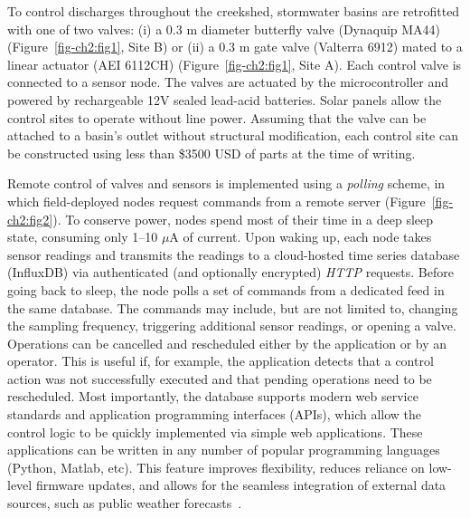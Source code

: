 To control discharges throughout the creekshed, stormwater basins are retrofitted with one of two valves: (i) a 0.3 m diameter butterfly valve (Dynaquip MA44) (Figure~\ref{fig-ch2:fig1}, Site B) or (ii) a 0.3 m gate valve (Valterra 6912) mated to a linear actuator (AEI 6112CH) (Figure~\ref{fig-ch2:fig1}, Site A). Each control valve is connected to a sensor node. The valves are actuated by the microcontroller and powered by rechargeable 12V sealed lead-acid batteries. Solar panels allow the control sites to operate without line power. Assuming that the valve can be attached to a basin's outlet without structural modification, each control site can be constructed using less than \$3500 USD of parts at the time of writing.

Remote control of valves and sensors is implemented using a \textit{polling} scheme, in which field-deployed nodes request commands from a remote server (Figure~\ref{fig-ch2:fig2}). To conserve power, nodes spend most of their time in a deep sleep state, consuming only 1--10 $\mu$A of current. Upon waking up, each node takes sensor readings and transmits the readings to a cloud-hosted time series database (InfluxDB) via authenticated (and optionally encrypted) \textit{HTTP} requests. Before going back to sleep, the node polls a set of commands from a dedicated feed in the same database. The commands may include, but are not limited to, changing the sampling frequency, triggering additional sensor readings, or opening a valve.
Operations can be cancelled and rescheduled either by the application or by an operator. This is useful if, for example, the application detects that a control action was not successfully executed and that pending operations need to be rescheduled. Most importantly, the database supports modern web service standards and application programming interfaces (APIs), which allow the control logic to be quickly implemented via simple web applications. These applications can be written in any number of popular programming languages (Python, Matlab, etc). This feature improves flexibility, reduces reliance on low-level firmware updates, and allows for the seamless integration of external data sources, such as public weather forecasts~\cite{Wong_2016b, Bartos_2018}.

